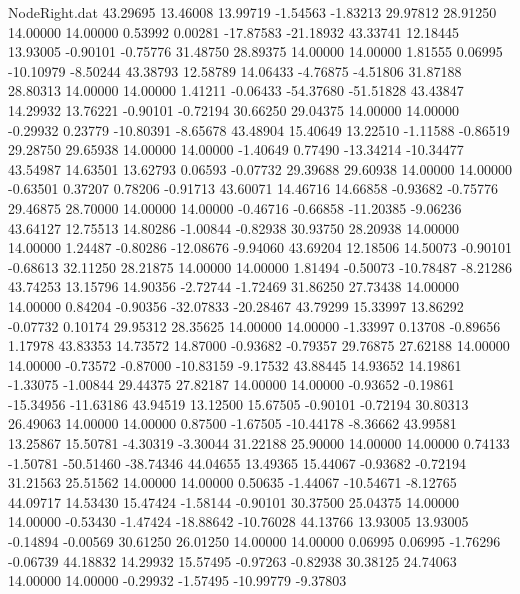 \begin{filecontents}{NodeRight.dat}
  43.29695   13.46008   13.99719    -1.54563   -1.83213   29.97812   28.91250   14.00000   14.00000    0.53992    0.00281  -17.87583  -21.18932
  43.33741   12.18445   13.93005    -0.90101   -0.75776   31.48750   28.89375   14.00000   14.00000    1.81555    0.06995  -10.10979   -8.50244
  43.38793   12.58789   14.06433    -4.76875   -4.51806   31.87188   28.80313   14.00000   14.00000    1.41211   -0.06433  -54.37680  -51.51828
  43.43847   14.29932   13.76221    -0.90101   -0.72194   30.66250   29.04375   14.00000   14.00000   -0.29932    0.23779  -10.80391   -8.65678
  43.48904   15.40649   13.22510    -1.11588   -0.86519   29.28750   29.65938   14.00000   14.00000   -1.40649    0.77490  -13.34214  -10.34477
  43.54987   14.63501   13.62793     0.06593   -0.07732   29.39688   29.60938   14.00000   14.00000   -0.63501    0.37207    0.78206   -0.91713
  43.60071   14.46716   14.66858    -0.93682   -0.75776   29.46875   28.70000   14.00000   14.00000   -0.46716   -0.66858  -11.20385   -9.06236
  43.64127   12.75513   14.80286    -1.00844   -0.82938   30.93750   28.20938   14.00000   14.00000    1.24487   -0.80286  -12.08676   -9.94060
  43.69204   12.18506   14.50073    -0.90101   -0.68613   32.11250   28.21875   14.00000   14.00000    1.81494   -0.50073  -10.78487   -8.21286
  43.74253   13.15796   14.90356    -2.72744   -1.72469   31.86250   27.73438   14.00000   14.00000    0.84204   -0.90356  -32.07833  -20.28467
  43.79299   15.33997   13.86292    -0.07732    0.10174   29.95312   28.35625   14.00000   14.00000   -1.33997    0.13708   -0.89656    1.17978
  43.83353   14.73572   14.87000    -0.93682   -0.79357   29.76875   27.62188   14.00000   14.00000   -0.73572   -0.87000  -10.83159   -9.17532
  43.88445   14.93652   14.19861    -1.33075   -1.00844   29.44375   27.82187   14.00000   14.00000   -0.93652   -0.19861  -15.34956  -11.63186
  43.94519   13.12500   15.67505    -0.90101   -0.72194   30.80313   26.49063   14.00000   14.00000    0.87500   -1.67505  -10.44178   -8.36662
  43.99581   13.25867   15.50781    -4.30319   -3.30044   31.22188   25.90000   14.00000   14.00000    0.74133   -1.50781  -50.51460  -38.74346
  44.04655   13.49365   15.44067    -0.93682   -0.72194   31.21563   25.51562   14.00000   14.00000    0.50635   -1.44067  -10.54671   -8.12765
  44.09717   14.53430   15.47424    -1.58144   -0.90101   30.37500   25.04375   14.00000   14.00000   -0.53430   -1.47424  -18.88642  -10.76028
  44.13766   13.93005   13.93005    -0.14894   -0.00569   30.61250   26.01250   14.00000   14.00000    0.06995    0.06995   -1.76296   -0.06739
  44.18832   14.29932   15.57495    -0.97263   -0.82938   30.38125   24.74063   14.00000   14.00000   -0.29932   -1.57495  -10.99779   -9.37803

\end{filecontents}
